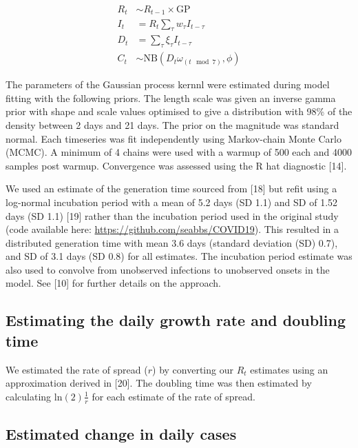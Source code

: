 \documentclass[
]{article}
\begin{document}
\begin{align}
  R_{t} &\sim R_{t-1} \times \mathrm{GP} \\
  I_t &= R_t \sum_\tau w_\tau I_{t - \tau} \\
  D_t &= \sum_\tau \xi_\tau I_{t-\tau} \\ 
  C_t &\sim \mathrm{NB}(D_t \omega_{(t \mod 7)} , \phi)
\end{align}

The parameters of the Gaussian process kernnl were estimated during
model fitting with the following priors. The length scale was given an
inverse gamma prior with shape and scale values optimised to give a
distribution with 98\% of the density between 2 days and 21 days. The
prior on the magnitude was standard normal. Each timeseries was fit
independently using Markov-chain Monte Carlo (MCMC). A minimum of 4
chains were used with a warmup of 500 each and 4000 samples post warmup.
Convergence was assessed using the R hat diagnostic {[}14{]}.

We used an estimate of the generation time sourced from {[}18{]} but
refit using a log-normal incubation period with a mean of 5.2 days (SD
1.1) and SD of 1.52 days (SD 1.1) {[}19{]} rather than the incubation
period used in the original study (code available here:
\url{https://github.com/seabbs/COVID19}). This resulted in a distributed
generation time with mean 3.6 days (standard deviation (SD) 0.7), and SD
of 3.1 days (SD 0.8) for all estimates. The incubation period estimate
was also used to convolve from unobserved infections to unobserved
onsets in the model. See {[}10{]} for further details on the approach.

\hypertarget{estimating-the-daily-growth-rate-and-doubling-time}{%
\subsection{Estimating the daily growth rate and doubling
time}\label{estimating-the-daily-growth-rate-and-doubling-time}}

We estimated the rate of spread (\(r\)) by converting our \(R_t\)
estimates using an approximation derived in {[}20{]}. The doubling time
was then estimated by calculating \(\text{ln}(2) \frac{1}{r}\) for each
estimate of the rate of spread.

\hypertarget{estimated-change-in-daily-cases}{%
\subsection{Estimated change in daily
cases}\label{estimated-change-in-daily-cases}}
\end{document}
